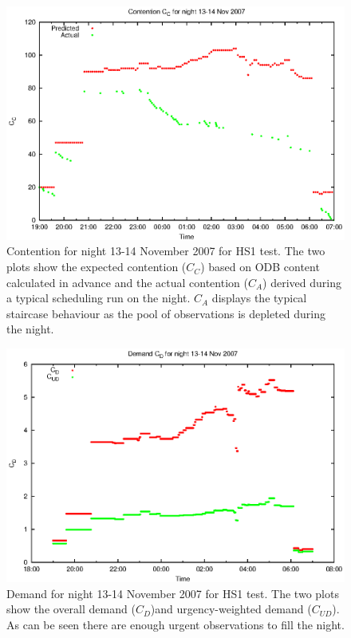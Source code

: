 \begin{figure}[htbp]
\begin{center}
    \includegraphics[scale=1.0, angle=0]{figures/mam/cont.eps}
\end{center}
\caption[Contention for night 13-14 November 2007.]
{Contention for night 13-14 November 2007 for HS1 test. The two plots show the expected contention ($C_C$) based on ODB content calculated in advance and the actual contention ($C_A$) derived during a typical scheduling run on the night. $C_A$ displays the typical staircase behaviour as the pool of observations is depleted during the night.}
\label{fig:mam_h1_contention}
\end{figure}

\begin{figure}[htbp]
\begin{center}
    \includegraphics[scale=1.0, angle=0]{figures/mam/dmd.eps}
\end{center}
\caption[Demand for night 13-14 November 2007.]
{Demand for night 13-14 November 2007 for HS1 test. The two plots show the overall demand ($C_D$)and urgency-weighted demand ($C_{UD}$). As can be seen there are enough urgent observations to fill the night.}
\label{fig:mam_h1_dmd}
\end{figure}


